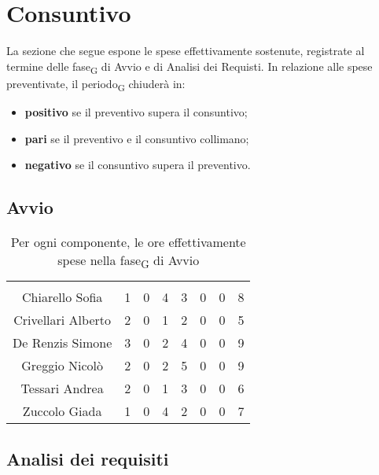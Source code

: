 \section{Consuntivo}

La sezione che segue espone le spese effettivamente sostenute, registrate al termine delle fase\textsubscript{G} di Avvio e di Analisi dei Requisti. In relazione alle spese preventivate, il periodo\textsubscript{G} chiuderà in:
\begin{itemize}
	\item \textbf{positivo} se il preventivo supera il consuntivo;
	\item \textbf{pari} se il preventivo e il consuntivo collimano;
	\item \textbf{negativo} se il consuntivo supera il preventivo.
\end{itemize}


\subsection{Avvio}

\begin{table}[H]
	\begin{center}
		\begin{tabular}{c
				!{\color[HTML]{9b240a}\vrule width 1pt}
				cccccc
				!{\color[HTML]{9b240a}\vrule width 1pt}	
				c}
			\rowcolorhead
			 &  &  &  &  &  &  &  \\
			
			Chiarello Sofia & 1 & 0 & 4 & 3 & 0 & 0 & 8\\
			Crivellari Alberto & 2 & 0 & 1 & 2 & 0 & 0 & 5\\
			De Renzis Simone & 3 & 0 & 2 & 4 & 0 & 0 & 9\\
			Greggio Nicolò & 2 & 0 & 2 & 5 & 0 & 0 & 9\\
			Tessari Andrea & 2 & 0 & 1 & 3 & 0 & 0 & 6\\
			Zuccolo Giada & 1 & 0 & 4 & 2 & 0 & 0 & 7\\
		\end{tabular}
		\caption[Consuntivo fase\textsubscript{G} di Avvio]{Per ogni componente, le ore effettivamente spese nella fase\textsubscript{G} di Avvio}
	\end{center}
\end{table}




\subsection{Analisi dei requisiti}

